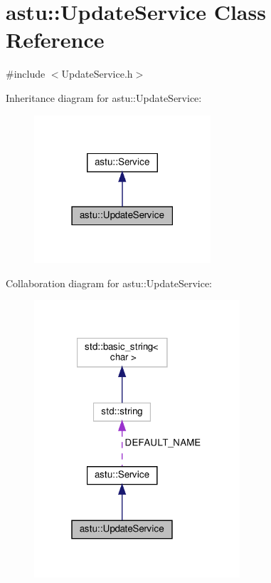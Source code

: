 \hypertarget{classastu_1_1UpdateService}{}\section{astu\+:\+:Update\+Service Class Reference}
\label{classastu_1_1UpdateService}


{\ttfamily \#include $<$Update\+Service.\+h$>$}



Inheritance diagram for astu\+:\+:Update\+Service\+:\nopagebreak
\begin{figure}[H]
\begin{center}
\leavevmode
\includegraphics[width=186pt]{classastu_1_1UpdateService__inherit__graph}
\end{center}
\end{figure}


Collaboration diagram for astu\+:\+:Update\+Service\+:\nopagebreak
\begin{figure}[H]
\begin{center}
\leavevmode
\includegraphics[width=217pt]{classastu_1_1UpdateService__coll__graph}
\end{center}
\end{figure}
